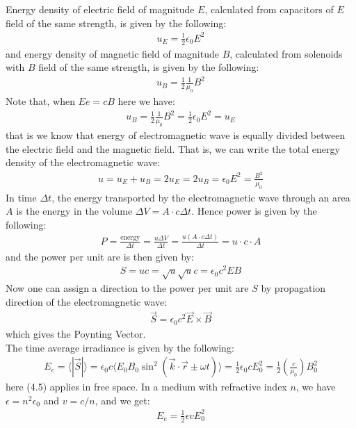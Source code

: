 \documentclass[11pt]{book}
\theoremstyle{break}
\theoremstyle{break}
\begin{document}
Energy density of electric field of magnitude $E$, calculated from capacitors of $E$ field of the same strength, is given by the following:
\begin{align*}
u_E = \frac{1}{2} \epsilon_0 E^2
\end{align*}
and energy density of magnetic field of magnitude $B$, calculated from solenoids with $B$ field of the same strength, is given by the following:
\begin{align*}
u_B = \frac{1}{2}\frac{1}{\mu_0}B^2
\end{align*}
Note that, when $Ee = cB$ here we have:
\begin{align*}
u_B = \frac{1}{2}\frac{1}{\mu_0}B^2 = \frac{1}{2}\epsilon_0 E^2 = u_E
\end{align*}
that is we know that energy of electromagnetic wave is equally divided between the electric field and the magnetic field. That is, we can write the total energy density of the electromagnetic wave:
\begin{align*}
u = u_E + u_B = 2u_E = 2u_B = \epsilon_0 E^2 = \frac{B^2}{\mu_0}
\end{align*}
In time $\Delta t$, the energy transported by the electromagnetic wave through an area $A$ is the energy in the volume $\Delta V = A \cdot c \Delta t$. Hence power is given by the following:
\begin{align*}
P = \frac{\text{energy}}{\Delta t} = \frac{u \Delta V}{\Delta t} = \frac{u(A\cdot c \Delta t)}{\Delta t} = u\cdot c \cdot A
\end{align*}
and the power per unit are is then given by:
\begin{align*}
S = uc =\sqrt{u}\sqrt{u}c =  \epsilon_0 c^2 EB
\end{align*}
Now one can assign a direction to the power per unit are $S$ by propagation direction of the electromagnetic wave:
\begin{align*}
\vec{S} = \epsilon_0 c^2 \vec{E}\times \vec{B}
\end{align*}
which gives the Poynting Vector.\\


The time average irradiance  is given by the following:
\begin{align}
E_e = \langle |\vec{S}|\rangle = \epsilon_0 c\langle E_0 B_0 \sin^2(\vec{k}\cdot \vec{r} \pm \omega t)\rangle  = \frac{1}{2}\epsilon_0 c E_0^2 = \frac{1}{2}\left( \frac{c}{\mu_0}\right)B_0^2
\end{align}
here (4.5) applies in free space. In a medium with refractive index $n$, we have $\epsilon = n^2 \epsilon_0$ and $v = c/n$, and we get:
\begin{align*}
E_e = \frac{1}{2}\epsilon v E_0^2 
\end{align*}
\end{document}
